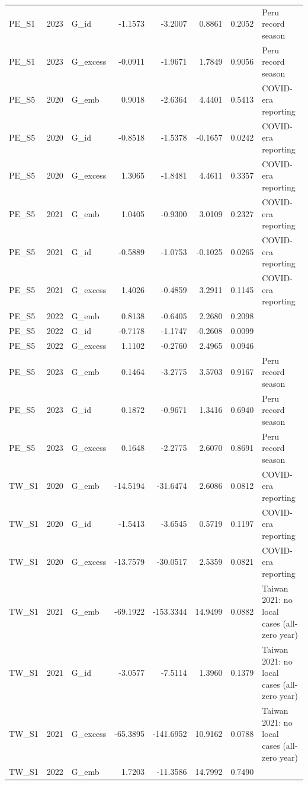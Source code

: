 \begin{tabular}{lllrrrrl}
PE\_S1 & 2023 & G\_id & -1.1573 & -3.2007 & 0.8861 & 0.2052 & Peru record season \\
PE\_S1 & 2023 & G\_excess & -0.0911 & -1.9671 & 1.7849 & 0.9056 & Peru record season \\
PE\_S5 & 2020 & G\_emb & 0.9018 & -2.6364 & 4.4401 & 0.5413 & COVID-era reporting \\
PE\_S5 & 2020 & G\_id & -0.8518 & -1.5378 & -0.1657 & 0.0242 & COVID-era reporting \\
PE\_S5 & 2020 & G\_excess & 1.3065 & -1.8481 & 4.4611 & 0.3357 & COVID-era reporting \\
PE\_S5 & 2021 & G\_emb & 1.0405 & -0.9300 & 3.0109 & 0.2327 & COVID-era reporting \\
PE\_S5 & 2021 & G\_id & -0.5889 & -1.0753 & -0.1025 & 0.0265 & COVID-era reporting \\
PE\_S5 & 2021 & G\_excess & 1.4026 & -0.4859 & 3.2911 & 0.1145 & COVID-era reporting \\
PE\_S5 & 2022 & G\_emb & 0.8138 & -0.6405 & 2.2680 & 0.2098 &  \\
PE\_S5 & 2022 & G\_id & -0.7178 & -1.1747 & -0.2608 & 0.0099 &  \\
PE\_S5 & 2022 & G\_excess & 1.1102 & -0.2760 & 2.4965 & 0.0946 &  \\
PE\_S5 & 2023 & G\_emb & 0.1464 & -3.2775 & 3.5703 & 0.9167 & Peru record season \\
PE\_S5 & 2023 & G\_id & 0.1872 & -0.9671 & 1.3416 & 0.6940 & Peru record season \\
PE\_S5 & 2023 & G\_excess & 0.1648 & -2.2775 & 2.6070 & 0.8691 & Peru record season \\
TW\_S1 & 2020 & G\_emb & -14.5194 & -31.6474 & 2.6086 & 0.0812 & COVID-era reporting \\
TW\_S1 & 2020 & G\_id & -1.5413 & -3.6545 & 0.5719 & 0.1197 & COVID-era reporting \\
TW\_S1 & 2020 & G\_excess & -13.7579 & -30.0517 & 2.5359 & 0.0821 & COVID-era reporting \\
TW\_S1 & 2021 & G\_emb & -69.1922 & -153.3344 & 14.9499 & 0.0882 & Taiwan 2021: no local cases (all-zero year) \\
TW\_S1 & 2021 & G\_id & -3.0577 & -7.5114 & 1.3960 & 0.1379 & Taiwan 2021: no local cases (all-zero year) \\
TW\_S1 & 2021 & G\_excess & -65.3895 & -141.6952 & 10.9162 & 0.0788 & Taiwan 2021: no local cases (all-zero year) \\
TW\_S1 & 2022 & G\_emb & 1.7203 & -11.3586 & 14.7992 & 0.7490 &  \\

\end{tabular}
